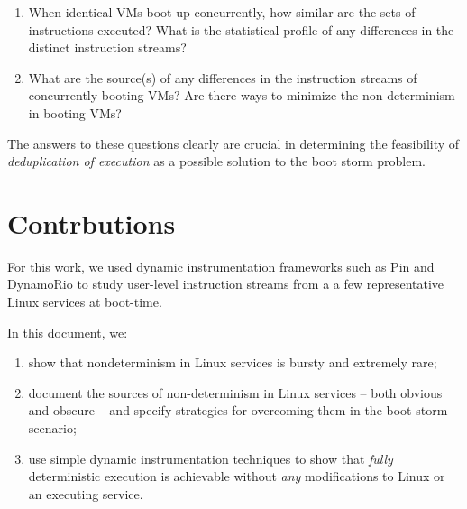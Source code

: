 \begin{enumerate}

\item When identical VMs boot up concurrently, how similar
are the sets of instructions executed? What is the statistical
profile of any differences in the distinct instruction streams?

\item What are the source(s) of any differences in
the instruction streams of concurrently booting VMs?
Are there ways to minimize the non-determinism in
booting VMs?

\end{enumerate}

The answers to these questions clearly are crucial in determining
the feasibility of \emph{deduplication of execution} as a possible solution
to the boot storm problem. 

\section{Contrbutions}
For this work, we used dynamic instrumentation frameworks such as Pin \cite{luk2005pin} and
DynamoRio \cite{bruening2004dr} to study user-level instruction streams from a
a few representative Linux services at boot-time. \newline

In this document, we:
\begin {enumerate}
\item show that nondeterminism in Linux services is bursty and extremely rare;
\item document the sources of non-determinism in Linux services -- both obvious and obscure --
  and specify strategies for overcoming them in the boot storm scenario;
\item use simple dynamic instrumentation techniques to show that \emph{fully} deterministic execution is achievable
  without \emph{any} modifications to Linux or an executing service.
\end {enumerate}

